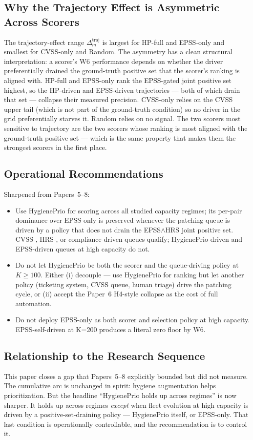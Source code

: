 \subsection{Why the Trajectory Effect is Asymmetric Across Scorers}

The trajectory-effect range $\Delta^{\mathrm{traj}}_m$ is largest for
HP-full and EPSS-only and smallest for CVSS-only and Random. The
asymmetry has a clean structural interpretation: a scorer's W6
performance depends on whether the driver preferentially drained the
ground-truth positive set that the scorer's ranking is aligned with.
HP-full and EPSS-only rank the EPSS-gated joint positive set highest,
so the HP-driven and EPSS-driven trajectories --- both of which drain
that set --- collapse their measured precision. CVSS-only relies on
the CVSS upper tail (which is not part of the ground-truth condition)
so no driver in the grid preferentially starves it. Random relies on
no signal. The two scorers most sensitive to trajectory are the two
scorers whose ranking is most aligned with the ground-truth positive
set --- which is the same property that makes them the strongest
scorers in the first place.

\subsection{Operational Recommendations}

Sharpened from Papers~5--8:
\begin{itemize}
\item Use HygienePrio for scoring across all studied capacity
regimes; its per-pair dominance over EPSS-only is preserved
whenever the patching queue is driven by a policy that does not
drain the EPSS$\wedge$HRS joint positive set. CVSS-, HRS-, or
compliance-driven queues qualify; HygienePrio-driven and
EPSS-driven queues at high capacity do not.
\item Do not let HygienePrio be both the scorer and the queue-driving
policy at $K \geq 100$. Either (i) decouple --- use HygienePrio
for ranking but let another policy (ticketing system, CVSS queue,
human triage) drive the patching cycle, or (ii) accept the Paper~6
H4-style collapse as the cost of full automation.
\item Do not deploy EPSS-only as both scorer and selection policy at
high capacity. EPSS-self-driven at K=200 produces a literal zero
floor by W6.
\end{itemize}

\subsection{Relationship to the Research Sequence}

This paper closes a gap that Papers~5--8 explicitly bounded but did
not measure. The cumulative arc is unchanged in spirit: hygiene
augmentation helps prioritization. But the headline ``HygienePrio
holds up across regimes'' is now sharper. It holds up across regimes
\textit{except} when fleet evolution at high capacity is driven by a
positive-set-draining policy --- HygienePrio itself, or EPSS-only.
That last condition is operationally
controllable, and the recommendation is to control it.
